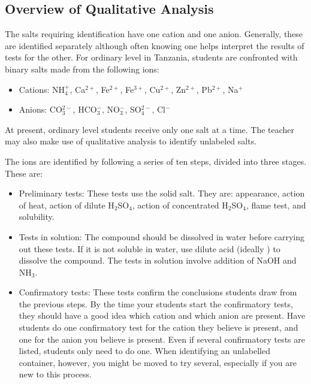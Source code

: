 
\subsection{Overview of Qualitative Analysis}

The salts requiring identification have one cation and one anion. Generally, these are identified separately although often knowing one helps interpret the results of tests for the other. For ordinary level in Tanzania, students are confronted with binary salts made from the following ions:

\begin{itemize}
\item{Cations: NH$_{4}^{+}$, 
Ca$^{2+}$, 
Fe$^{2+}$, 
Fe$^{3+}$, 
Cu$^{2+}$, 
Zn$^{2+}$, 
Pb$^{2+}$, 
Na$^{+}$}
\item{Anions: CO$_{3}^{2-}$, 
HCO$_{3}^{-}$, 
NO$_{3}^{-}$, 
SO$_{4}^{2-}$, 
Cl$^{-}$}
\end{itemize}
At present, 
ordinary level students receive only one salt at a time. The teacher may also make use of qualitative analysis to identify unlabeled salts.

The ions are identified by following a series of ten steps, divided into three stages. These are:
\begin{itemize}
\item{Preliminary tests:
These tests use the solid salt. They are: appearance, action of heat, action of dilute H$_{2}$SO$_{4}$, action of concentrated H$_{2}$SO$_{4}$, flame test, and solubility.}
\item{Tests in solution: The compound should be dissolved in water before carrying out these tests. If it is not soluble in water, use dilute acid (ideally ) to dissolve the compound. The tests in solution involve addition of NaOH and NH$_{3}$.}
\item{Confirmatory tests: These tests confirm the conclusions students draw from the previous steps. By the time your students start the confirmatory tests, they should have a good idea which cation and which anion are present. Have students do one confirmatory test for the cation they believe is present, and one for the anion you believe is present. Even if several confirmatory tests are listed, students only need to do one. When identifying an unlabelled container, however, you might be moved to try several, especially if you are new to this process.}
\end{itemize}

